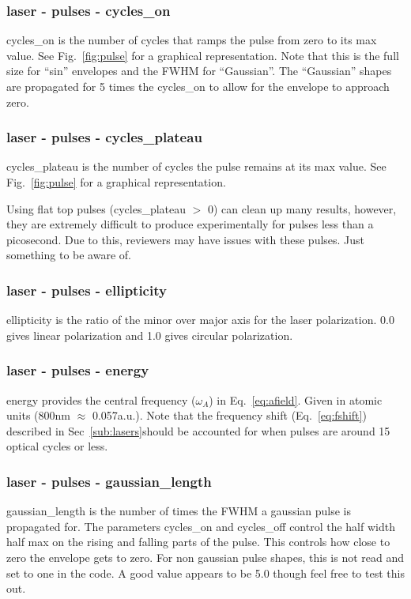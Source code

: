 \documentclass{article}
\begin{document}
\subsubsection{laser - pulses - cycles\_on}
cycles\_on is the number of cycles that ramps the pulse from zero to its max value. See Fig.~\ref{fig:pulse} for a graphical representation. Note that this is the full size for ``sin'' envelopes and the FWHM for ``Gaussian''. The ``Gaussian'' shapes are propagated for 5 times the cycles\_on to allow for the envelope to approach zero.

\subsubsection{laser - pulses - cycles\_plateau}
cycles\_plateau is the number of cycles the pulse remains at its max value. See Fig.~\ref{fig:pulse} for a graphical representation.

Using flat top pulses (cycles\_plateau $>$ 0) can clean up many results, however, they are extremely difficult to produce experimentally for pulses less than a picosecond. Due to this, reviewers may have issues with these pulses. Just something to be aware of.

\subsubsection{laser - pulses - ellipticity}
ellipticity is the ratio of the minor over major axis for the laser polarization. 0.0 gives linear polarization and 1.0 gives circular polarization.

\subsubsection{laser - pulses - energy}
energy provides the central frequency ($\omega_A$) in Eq.~\ref{eq:afield}. Given in atomic units (800nm $\approx$ 0.057a.u.). Note that the frequency shift (Eq.~\ref{eq:fshift}) described in Sec~\ref{sub:lasers}should be accounted for when pulses are around 15 optical cycles or less.

\subsubsection{laser - pulses - gaussian\_length}
gaussian\_length is the number of times the FWHM a gaussian pulse is propagated for. The parameters cycles\_on and cycles\_off control the half width half max on the rising and falling parts of the pulse. This controls how close to zero the envelope gets to zero. For non gaussian pulse shapes, this is not read and set to one in the code. A good value appears to be 5.0 though feel free to test this out.
\end{document}

